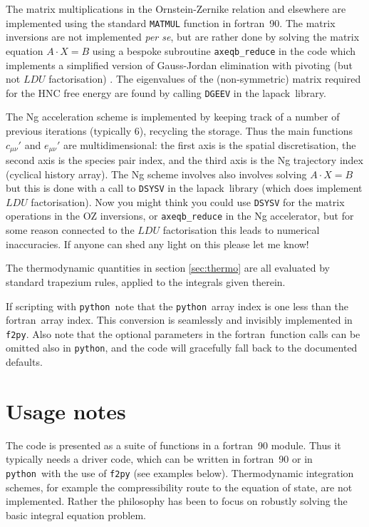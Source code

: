 \documentclass[12pt,a4paper]{article}
\newcommand{\latin}[1]{\emph{#1}}
\newcommand{\perse}{\latin{per se}}
\newcommand{\FORTRAN}{{\sc fortran}}
\newcommand{\python}{{\tt python}}
\newcommand{\LAPACK}{{\sc lapack}}
\begin{document}
The matrix multiplications in the Ornstein-Zernike relation and elsewhere
are implemented using the standard \verb+MATMUL+ function in
\FORTRAN\ 90.  The matrix inversions are not implemented \perse, but
are rather done by solving the matrix equation $A\cdot X=B$ using a
bespoke subroutine \verb+axeqb_reduce+ in the code which implements a
simplified version of Gauss-Jordan elimination with pivoting (but not
$LDU$ factorisation) \cite{NR92}.  The eigenvalues of the
(non-symmetric) matrix required for the HNC free energy are found by
calling \verb+DGEEV+ in the \LAPACK\ library.

The Ng acceleration scheme is implemented by keeping track of a number
of previous iterations (typically 6), recycling the storage.  Thus the
main functions $c_{\mu\nu}'$ and $e_{\mu\nu}'$ are multidimensional:
the first axis is the spatial discretisation, the second axis is the
species pair index, and the third axis is the Ng trajectory index
(cyclical history array).  The Ng scheme involves also involves
solving $A\cdot X=B$ but this is done with a call to \verb+DSYSV+ in
the \LAPACK\ library (which does implement $LDU$ factorisation).  Now
you might think you could use \verb+DSYSV+ for the matrix operations
in the OZ inversions, or \verb+axeqb_reduce+ in the Ng accelerator,
but for some reason connected to the $LDU$ factorisation this leads to
numerical inaccuracies.  If anyone can shed any light on this please
let me know!

The thermodynamic quantities in section \ref{sec:thermo} are all
evaluated by standard trapezium rules, applied to the integrals given
therein.  

If scripting with \python\ note that the \python\ array index is one
less than the \FORTRAN\ array index.  This conversion is seamlessly
and invisibly implemented in \verb+f2py+.  Also note that the optional
parameters in the \FORTRAN\ function calls can be omitted also in \python,
and the code will gracefully fall back to the documented defaults.

\section{Usage notes}
%
The code is presented as a suite of functions in a \FORTRAN\ 90
module.  Thus it typically needs a driver code, which can be written
in \FORTRAN\ 90 or in \python\ with the use of \verb+f2py+ (see
examples below).  Thermodynamic integration schemes, for example the
compressibility route to the equation of state, are not implemented.
Rather the philosophy has been to focus on robustly solving the basic
integral equation problem.
\end{document}

